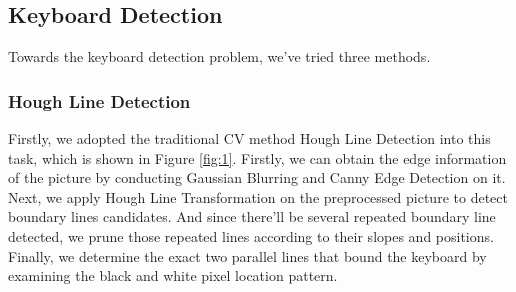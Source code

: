 \documentclass[10pt,twocolumn,letterpaper]{article}
\begin{document}
\subsection{Keyboard Detection} \label{keyboarddetection}
\label{Keyboard}

Towards the keyboard detection problem, we've tried three methods. 

\subsubsection{Hough Line Detection}
Firstly, we adopted the traditional CV method Hough Line Detection into this task, which is shown in Figure \ref{fig:1}. 
Firstly, we can obtain the edge information of the picture by conducting Gaussian Blurring and Canny Edge Detection on it.
Next, we apply Hough Line Transformation \cite{Hough} on the preprocessed picture to detect boundary lines candidates. 
And since there'll be several repeated boundary line detected, we prune those repeated lines according to their slopes and positions.
Finally, we determine the exact two parallel lines that bound the keyboard by examining the black and white pixel location pattern. 
\end{document}
